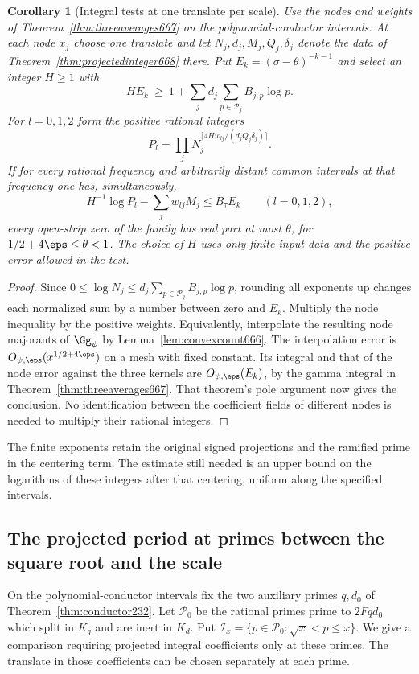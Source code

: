 \documentclass[a4paper,11pt]{article}
\newtheorem{corollary}[proposition]{Corollary}
\theoremstyle{definition}
\theoremstyle{remark}
\numberwithin{equation}{section}
\begin{document}
\begin{corollary}[Integral tests at one translate per scale]
\leavevmode\label{cor:intervalintegers668}
Use the nodes and weights of Theorem~\ref{thm:threeaverages667}
on the polynomial-conductor intervals. At each node \(x_j\) choose
one translate and let \(N_j,d_j,M_j,Q_j,\delta_j\) denote the data
of Theorem~\ref{thm:projectedinteger668} there. Put
\(E_k=(\sigma-\theta)^{-k-1}\) and select an integer \(H\ge1\)
with
\[
 H E_k \ \ge\ 1+\sum_j d_j\sum_{p\in\mathcal P_j}B_{j,p}\log p .
\]
For \(l=0,1,2\) form the positive rational integers
\[
 P_l=\prod_j N_j^{\lceil 4H w_{lj}/(d_j Q_j\delta_j)\rceil}.
\]
If for every rational frequency and arbitrarily distant common
intervals at that frequency one has, simultaneously,
\[
      H^{-1}\log P_l-\sum_j w_{lj}M_j\le B_\tau E_k
          \qquad(l=0,1,2),
\]
every open-strip zero of the family has real part at most
\(\theta\), for \(1/2+4\eps\le\theta<1\). The choice of \(H\)
uses only finite input data and the positive error allowed in
the test.
\end{corollary}
\begin{proof}
Since \(0\le\log N_j\le d_j\sum_{p\in\mathcal P_j}B_{j,p}\log p\),
rounding all exponents up changes each normalized sum by a number
between zero and \(E_k\). Multiply the node inequality by the
positive weights. Equivalently, interpolate the resulting node
majorants of \(\Gg_\psi\) by Lemma~\ref{lem:convexcount666}.
The interpolation error is \(O_{\psi,\eps}(x^{1/2+4\eps})\) on a
mesh with fixed constant. Its integral and that of the node error
against the three kernels are \(O_{\psi,\eps}(E_k)\), by the
gamma integral in Theorem~\ref{thm:threeaverages667}.
That theorem's pole argument now gives the conclusion. No
identification between the coefficient fields of different nodes
is needed to multiply their rational integers.
\end{proof}

The finite exponents retain the original signed projections and
the ramified prime in the centering term. The estimate still
needed is an upper bound on the logarithms of these integers
after that centering, uniform along the specified intervals.


\subsection{The projected period at primes between the square root and the scale}
\label{sec:mediumsignal670}

On the polynomial-conductor intervals fix the two auxiliary primes
\(q,d_0\) of Theorem~\ref{thm:conductor232}. Let \(\mathcal P_0\)
be the rational primes prime to \(2Fqd_0\) which split in \(K_q\)
and are inert in \(K_d\). Put
\(\mathcal I_x=\{p\in\mathcal P_0:\sqrt{x}<p\le x\}\).
We give a comparison requiring projected integral coefficients
only at these primes. The translate in those coefficients can
be chosen separately at each prime.
\end{document}
